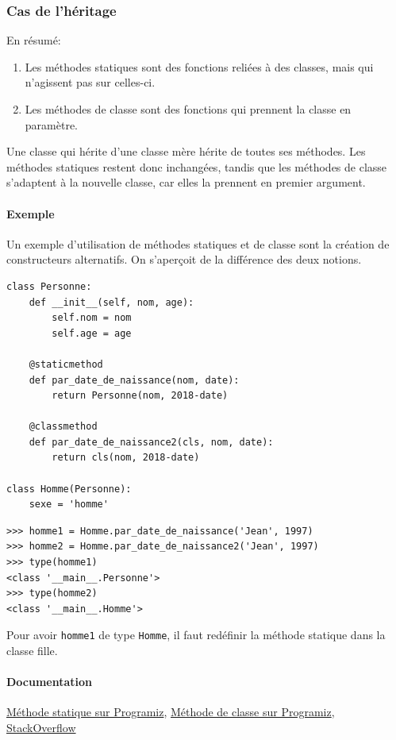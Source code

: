 \documentclass[a4paper, 10pt]{article}
\begin{document}
\subsubsection{Cas de l'héritage}
En résumé:
\begin{enumerate}
        \item Les méthodes statiques sont des fonctions reliées à des classes, mais qui n'agissent pas sur celles-ci.
        \item Les méthodes de classe sont des fonctions qui prennent la classe en paramètre.
\end{enumerate}

Une classe qui hérite d'une classe mère hérite de toutes ses méthodes. Les méthodes statiques restent donc inchangées, tandis que les méthodes de classe s'adaptent à la nouvelle classe, car elles la prennent en premier argument.

\paragraph{Exemple} Un exemple d'utilisation de méthodes statiques et de classe sont la création de constructeurs alternatifs. On s'aperçoit de la différence des deux notions.
\begin{verbatim}
class Personne:
    def __init__(self, nom, age):
        self.nom = nom
        self.age = age

    @staticmethod
    def par_date_de_naissance(nom, date):
        return Personne(nom, 2018-date)

    @classmethod
    def par_date_de_naissance2(cls, nom, date):
        return cls(nom, 2018-date)

class Homme(Personne):
    sexe = 'homme'
\end{verbatim}
\begin{Verbatim}[frame=single, fontsize=\footnotesize]
>>> homme1 = Homme.par_date_de_naissance('Jean', 1997)
>>> homme2 = Homme.par_date_de_naissance2('Jean', 1997)
>>> type(homme1)
<class '__main__.Personne'>
>>> type(homme2)
<class '__main__.Homme'>
\end{Verbatim}

Pour avoir \texttt{homme1} de type \texttt{Homme}, il faut redéfinir la méthode statique dans la classe fille.

\paragraph{Documentation} \href{https://www.programiz.com/python-programming/methods/built-in/staticmethod}{Méthode statique sur Programiz}, \href{https://www.programiz.com/python-programming/methods/built-in/classmethod}{Méthode de classe sur Programiz}, \href{https://stackoverflow.com/questions/136097/what-is-the-difference-between-staticmethod-and-classmethod-in-python/1669524#1669524}{StackOverflow}
\end{document}
